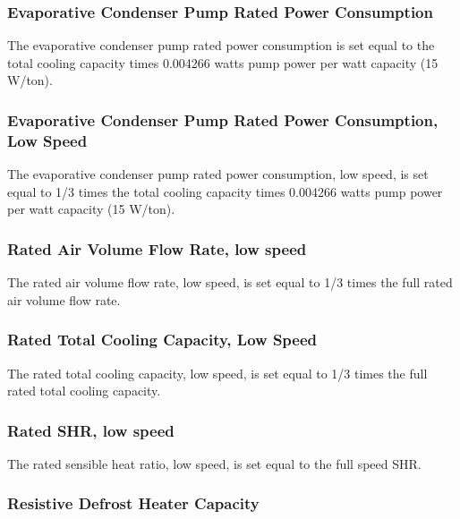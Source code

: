 \subsubsection{Evaporative Condenser Pump Rated Power Consumption}\label{evaporative-condenser-pump-rated-power-consumption}

The evaporative condenser pump rated power consumption is set equal to the total cooling capacity times 0.004266 watts pump power per watt capacity (15 W/ton).

\subsubsection{Evaporative Condenser Pump Rated Power Consumption, Low Speed}\label{evaporative-condenser-pump-rated-power-consumption-low-speed}

The evaporative condenser pump rated power consumption, low speed, is set equal to 1/3 times the total cooling capacity times 0.004266 watts pump power per watt capacity (15 W/ton).

\subsubsection{Rated Air Volume Flow Rate, low speed}\label{rated-air-volume-flow-rate-low-speed}

The rated air volume flow rate, low speed, is set equal to 1/3 times the full rated air volume flow rate.

\subsubsection{Rated Total Cooling Capacity, Low Speed}\label{rated-total-cooling-capacity-low-speed}

The rated total cooling capacity, low speed, is set equal to 1/3 times the full rated total cooling capacity.

\subsubsection{Rated SHR, low speed}\label{rated-shr-low-speed}

The rated sensible heat ratio, low speed, is set equal to the full speed SHR.

\subsubsection{Resistive Defrost Heater Capacity}\label{resistive-defrost-heater-capacity}

